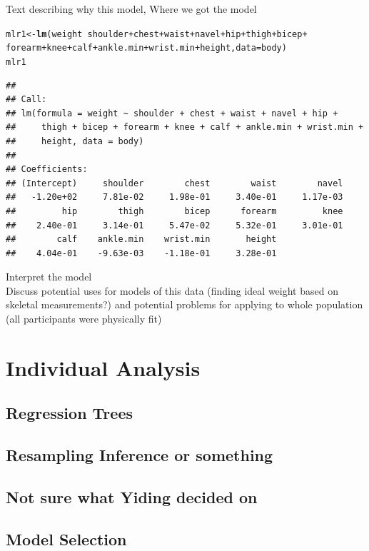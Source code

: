 \documentclass[11pt]{article}\usepackage[]{graphicx}\usepackage[]{color}
\makeatletter
\newcommand{\hlopt}[1]{\textcolor[rgb]{0,0,0}{#1}}%
\newcommand{\hlstd}[1]{\textcolor[rgb]{0.345,0.345,0.345}{#1}}%
\newcommand{\hlkwb}[1]{\textcolor[rgb]{0.69,0.353,0.396}{#1}}%
\newcommand{\hlkwc}[1]{\textcolor[rgb]{0.333,0.667,0.333}{#1}}%
\newcommand{\hlkwd}[1]{\textcolor[rgb]{0.737,0.353,0.396}{\textbf{#1}}}%
\newenvironment{kframe}{%
 \def\at@end@of@kframe{}%
 \ifinner\ifhmode%
  \def\at@end@of@kframe{\end{minipage}}%
  \begin{minipage}{\columnwidth}%
 \fi\fi%
 \def\FrameCommand##1{\hskip\@totalleftmargin \hskip-\fboxsep
 \colorbox{shadecolor}{##1}\hskip-\fboxsep
     \hskip-\linewidth \hskip-\@totalleftmargin \hskip\columnwidth}%
 \MakeFramed {\advance\hsize-\width
   \@totalleftmargin\z@ \linewidth\hsize
   \@setminipage}}%
 {\par\unskip\endMakeFramed%
 \at@end@of@kframe}
\newenvironment{knitrout}{}{} %
\makeatother
\begin{document}
Text describing why this model, Where we got the model\\

\begin{knitrout}
\color{fgcolor}\begin{kframe}
\begin{alltt}
\hlstd{mlr1} \hlkwb{<-} \hlkwd{lm}\hlstd{(weight} \hlopt{~} \hlstd{shoulder} \hlopt{+} \hlstd{chest} \hlopt{+} \hlstd{waist} \hlopt{+} \hlstd{navel} \hlopt{+} \hlstd{hip} \hlopt{+} \hlstd{thigh} \hlopt{+} \hlstd{bicep} \hlopt{+}
    \hlstd{forearm} \hlopt{+} \hlstd{knee} \hlopt{+} \hlstd{calf} \hlopt{+} \hlstd{ankle.min} \hlopt{+} \hlstd{wrist.min} \hlopt{+} \hlstd{height,} \hlkwc{data} \hlstd{= body)}
\hlstd{mlr1}
\end{alltt}
\begin{verbatim}
## 
## Call:
## lm(formula = weight ~ shoulder + chest + waist + navel + hip + 
##     thigh + bicep + forearm + knee + calf + ankle.min + wrist.min + 
##     height, data = body)
## 
## Coefficients:
## (Intercept)     shoulder        chest        waist        navel  
##   -1.20e+02     7.81e-02     1.98e-01     3.40e-01     1.17e-03  
##         hip        thigh        bicep      forearm         knee  
##    2.40e-01     3.14e-01     5.47e-02     5.32e-01     3.01e-01  
##        calf    ankle.min    wrist.min       height  
##    4.04e-01    -9.63e-03    -1.18e-01     3.28e-01
\end{verbatim}
\end{kframe}
\end{knitrout}


Interpret the model\\

Discuss potential uses for models of this data (finding ideal weight based on skeletal measurements?) and potential problems for applying to whole population (all participants were physically fit)


\section{Individual Analysis}


\subsection{Regression Trees}


\subsection{Resampling Inference or something}


\subsection{Not sure what Yiding decided on}


\subsection{Model Selection}
\end{document}
